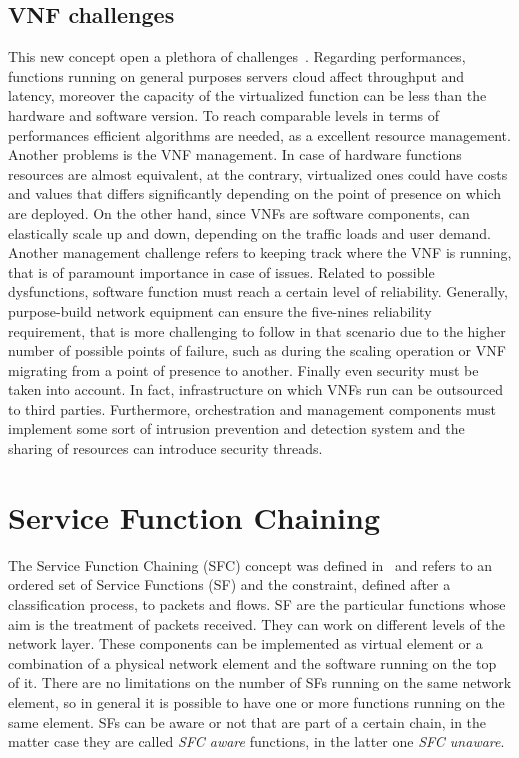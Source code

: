 \subsection{VNF challenges}
This new concept open a plethora of challenges~\cite{han2015network}. Regarding
performances, functions running on general purposes servers cloud affect
throughput and latency, moreover the capacity of the virtualized function can
be less than the hardware and software version. To reach comparable levels in
terms of performances efficient algorithms are needed, as a excellent resource
management. Another problems is the VNF management. In case of hardware
functions resources are almost equivalent, at the contrary, virtualized ones
could have costs and values that differs significantly depending on the point
of presence on which are deployed. On the other hand, since VNFs are software
components, can elastically scale up and down, depending on the traffic loads
and user demand. Another management challenge refers to keeping track where the
VNF is running, that is of paramount importance in case of issues. Related to
possible dysfunctions, software function must reach a certain level of
reliability. Generally, purpose-build network equipment can ensure the
five-nines reliability requirement, that is more challenging to follow in that
scenario due to the higher number of possible points of failure, such as during
the scaling operation or VNF migrating from a point of presence to another.
Finally even security must be taken into account. In fact, infrastructure on
which VNFs run can be outsourced to third parties. Furthermore, orchestration
and management components must implement some sort of intrusion prevention and
detection system and the sharing of resources can introduce security threads.

\section{Service Function Chaining}
The Service Function Chaining (SFC) concept was defined 
in~\cite{halpern2015service} and refers to an ordered set of Service Functions
(SF) and the constraint, defined after a classification process, to packets and
flows. SF are the particular functions whose aim is the treatment of packets
received. They can work on different levels of the network layer. These
components can be implemented as virtual element or a combination of a physical
network element and the software running on the top of it. 
There are no limitations on the number of SFs running on the same network
element, so in general it is possible to have one or more functions running on
the same element. SFs can be aware or not that are part of a certain chain, in
the matter case they are called \emph{SFC aware} functions, in the latter one
\emph{SFC unaware}.

